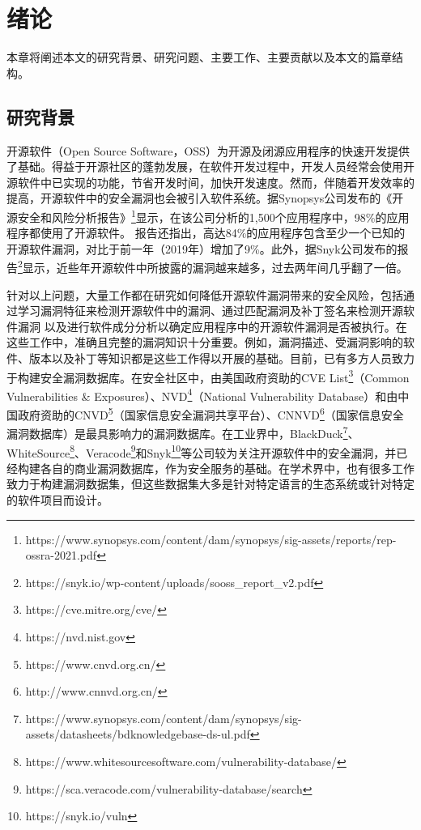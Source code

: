 \chapter{绪论}

本章将阐述本文的研究背景、研究问题、主要工作、主要贡献以及本文的篇章结构。

\section{研究背景}

开源软件（Open Source Software，OSS）为开源及闭源应用程序的快速开发提供了基础。得益于开源社区的蓬勃发展，在软件开发过程中，开发人员经常会使用开源软件中已实现的功能，节省开发时间，加快开发速度\cite{Wang2020empirical}。然而，伴随着开发效率的提高，开源软件中的安全漏洞也会被引入软件系统\cite{2何熙巽2020软件供应链安全综述,3刘剑2018软件与网络安全研究综述}。据Synopsys公司发布的《开源安全和风险分析报告》\footnote{https://www.synopsys.com/content/dam/synopsys/sig-assets/reports/rep-ossra-2021.pdf}显示，在该公司分析的1,500个应用程序中，98\%的应用程序都使用了开源软件。
报告还指出，高达84\%的应用程序包含至少一个已知的开源软件漏洞，对比于前一年（2019年）增加了9\%。此外，据Snyk公司发布的报告\footnote{https://snyk.io/wp-content/uploads/sooss\_report\_v2.pdf}显示，近些年开源软件中所披露的漏洞越来越多，过去两年间几乎翻了一倍。

针对以上问题，大量工作都在研究如何降低开源软件漏洞带来的安全风险，包括通过学习漏洞特征来检测开源软件中的漏洞\cite{li2016vulpecker,li2018vuldeepecker,zhou2019devign,jimenez2019importance}、通过匹配漏洞及补丁签名来检测开源软件漏洞\cite{jang2012redebug, kim2017vuddy, xu2020patch, xiao2020mvp, cui2020vuldetector}%
以及进行软件成分分析以确定应用程序中的开源软件漏洞是否被执行\cite{pashchenko2018vulnerable, ponta2020detection, pashchenko2020vuln4real, Wang2020empirical}。在这些工作中，准确且完整的漏洞知识十分重要。例如，漏洞描述、受漏洞影响的软件、版本以及补丁等知识都是这些工作得以开展的基础。目前，已有多方人员致力于构建安全漏洞数据库。在安全社区中，由美国政府资助的CVE List\footnote{https://cve.mitre.org/cve/}（Common Vulnerabilities \& Exposures）、NVD\footnote{https://nvd.nist.gov}（National Vulnerability Database）和由中国政府资助的CNVD\footnote{https://www.cnvd.org.cn/}（国家信息安全漏洞共享平台）、CNNVD\footnote{http://www.cnnvd.org.cn/}（国家信息安全漏洞数据库）是最具影响力的漏洞数据库。在工业界中，BlackDuck\footnote{https://www.synopsys.com/content/dam/synopsys/sig-assets/datasheets/bdknowledgebase-ds-ul.pdf}、WhiteSource\footnote{https://www.whitesourcesoftware.com/vulnerability-database/}、Veracode\footnote{https://sca.veracode.com/vulnerability-database/search}和Snyk\footnote{https://snyk.io/vuln}等公司较为关注开源软件中的安全漏洞，并已经构建各自的商业漏洞数据库，作为安全服务的基础。在学术界中，也有很多工作致力于构建漏洞数据集\cite{ponta2019manually,fan2020ac,jimenez2018enabling,gkortzis2018vulinoss,namrud2019androvul}，但这些数据集大多是针对特定语言的生态系统或针对特定的软件项目而设计。

